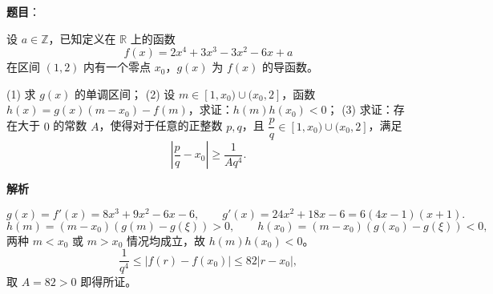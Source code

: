 \begin{answer}

\textbf{题目}：

设 $a\in\mathbb Z$，已知定义在 $\mathbb R$ 上的函数
\nopagebreak[4]
\[
f(x)=2x^4+3x^3-3x^2-6x+a
\]
在区间 $(1,2)$ 内有一个零点 $x_0$，$g(x)$ 为 $f(x)$ 的导函数。

(1)   求 $g(x)$ 的单调区间；
(2)   设 $m\in[1,x_0)\cup(x_0,2]$，函数 $h(x)=g(x)(m-x_0)-f(m)$，求证：$h(m)h(x_0)<0$；
(3)   求证：存在大于 $0$ 的常数 $A$，使得对于任意的正整数 $p,q$，且 $\dfrac pq\in[1,x_0)\cup(x_0,2]$，满足
\nopagebreak[4]
\[
\left|\frac pq-x_0\right|\geqslant\frac1{Aq^4}.
\]

\textbf{解析}

\nopagebreak[4]
\[
g(x)=f'(x)=8x^3+9x^2-6x-6,\qquad g'(x)=24x^2+18x-6=6(4x-1)(x+1).
\]
\nopagebreak[4]
\[
   h(m)=(m-x_0)(g(m)-g(\xi))>0,\qquad
   h(x_0)=(m-x_0)(g(x_0)-g(\xi))<0,
\]
   两种 $m<x_0$ 或 $m>x_0$ 情况均成立，故 $h(m)h(x_0)<0$。
\nopagebreak[4]
\[
   \frac1{q^4}\leqslant|f(r)-f(x_0)|\leqslant82|r-x_0|,
\]
   取 $A=82>0$ 即得所证。




\end{answer}